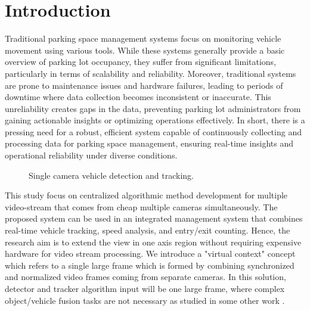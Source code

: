 \documentclass[5p,twocolumn,english]{elsarticle}
\begin{document}
\section{Introduction}
\label{sec_intro}

 

Traditional parking space management systems focus on monitoring vehicle movement using various tools. While these systems generally provide a basic overview of parking lot occupancy, they suffer from significant limitations, particularly in terms of scalability and reliability. Moreover, traditional systems are prone to maintenance issues and hardware failures, leading to periods of downtime where data collection becomes inconsistent or inaccurate. This unreliability creates gaps in the data, preventing parking lot administrators from gaining actionable insights or optimizing operations effectively. In short, there is a pressing need for a robust, efficient system capable of continuously collecting and processing data for parking space management, ensuring real-time insights and operational reliability under diverse conditions. 

  


  



\begin{figure}[t]
	\centering
	\caption{Single camera vehicle detection and tracking.}
	\label{fig1}
\end{figure}

This study focus on centralized algorithmic method development for multiple video-stream that comes from cheap multiple cameras simultaneously. The proposed system can be used in an integrated management system that combines real-time vehicle tracking, speed analysis, and entry/exit counting. Hence, the research aim is to extend the view in one axis region without requiring expensive hardware for video stream processing. We introduce a "virtual context" concept which refers to a single large frame which is formed by combining synchronized and normalized video frames coming from separate cameras. In this solution, detector and tracker algorithm input will be one large frame, where complex object/vehicle fusion tasks are not necessary as studied in some other work \cite{NEEDED}.
\end{document}
